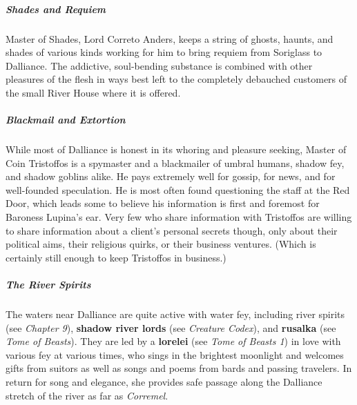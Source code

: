 \documentclass[10pt,a4paper,twoside,bg=print,twocolumn,openany,nodeprecatedcode]{dndbook}
\begin{document}
\subparagraph{Shades and Requiem}
Master of Shades, Lord Correto Anders, keeps a string of ghosts, haunts, and shades of various kinds working for him to bring requiem from Soriglass to Dalliance. The addictive, soul-bending substance is combined with other pleasures of the flesh in ways best left to the completely debauched customers of the small River House where it is offered.

\subparagraph{Blackmail and Extortion}
While most of Dalliance is honest in its whoring and pleasure seeking, Master of Coin Tristoffos is a spymaster and a blackmailer of umbral humans, shadow fey, and shadow goblins alike. He pays extremely well for gossip, for news, and for well-founded speculation. He is most often found questioning the staff at the Red Door, which leads some to believe his information is first and foremost for Baroness Lupina's ear. Very few who share information with Tristoffos are willing to share information about a client's personal secrets though, only about their political aims, their religious quirks, or their business ventures. (Which is certainly still enough to keep Tristoffos in business.)

\subparagraph{The River Spirits}
The waters near Dalliance are quite active with water fey, including river spirits (see \textit{Chapter 9}), \textbf{shadow river lords} (see \textit{Creature Codex}), and \textbf{rusalka} (see \textit{Tome of Beasts}). They are led by a \textbf{lorelei} (see \textit{Tome of Beasts 1}) in love with various fey at various times, who sings in the brightest moonlight and welcomes gifts from suitors as well as songs and poems from bards and passing travelers. In return for song and elegance, she provides safe passage along the Dalliance stretch of the river as far as \textit{Corremel}.
\end{document}
